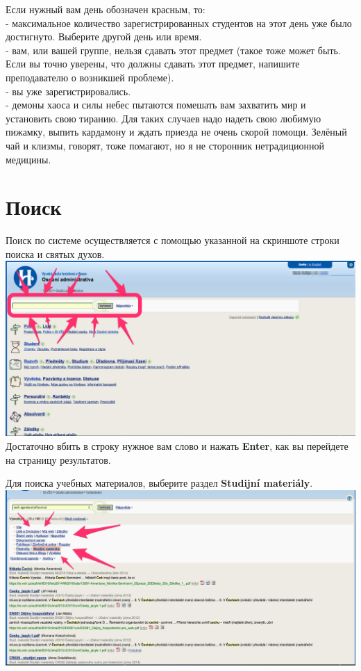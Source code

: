 \documentclass[a4paper,12pt]{article}
\begin{document}
Если нужный вам день обозначен красным, то: \\

- максимальное количество зарегистрированных студентов на этот день уже было достигнуто.
Выберите другой день или время. \\

- вам, или вашей группе, нельзя сдавать этот предмет (такое тоже может быть. Если вы точно
уверены, что должны сдавать этот предмет, напишите преподавателю о возникшей проблеме). \\

- вы уже зарегистрировались. \\

- демоны хаоса и силы небес пытаются помешать вам захватить мир и установить свою тиранию. 
Для таких случаев надо надеть свою любимую пижамку, выпить кардамону и ждать приезда 
не очень скорой помощи. Зелёный чай и клизмы, говорят, тоже помагают, но я не сторонник
нетрадиционной медицины.

\newpage

\section{Поиск}

Поиск по системе осуществляется с помощью указанной на скриншоте строки
поиска и святых духов. \\

\includegraphics[width=\textwidth]{s20} \\

Достаточно вбить в строку нужное вам слово и нажать \textbf{Enter}, 
как вы перейдете на страницу результатов.

Для поиска учебных материалов, выберите раздел \textbf{Studijní materiály}. \\

\includegraphics[width=\textwidth]{s21} \\
\end{document}
